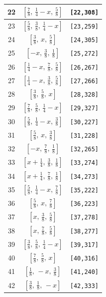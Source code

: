 \documentclass[fleqn,8pt]{jsarticle}
\begin{document}
\begin{longtable}{ccc}
22 & $\left[ \frac{7}{8},\, \frac{1}{4} - x,\, \frac{5}{8} \right]$ & {\tt [22,308]} \\ \hline
23 & $\left[ \frac{5}{8},\, \frac{3}{8},\, \frac{1}{4} - x \right]$ & {\tt [23,259]} \\ \hline
24 & $\left[ \frac{3}{8},\, x,\, \frac{5}{8} \right]$ & {\tt [24,305]} \\ \hline
25 & $\left[ - x,\, \frac{3}{8},\, \frac{1}{8} \right]$ & {\tt [25,272]} \\ \hline
26 & $\left[ \frac{1}{4} - x,\, \frac{7}{8},\, \frac{5}{8} \right]$ & {\tt [26,267]} \\ \hline
27 & $\left[ \frac{1}{4} - x,\, \frac{3}{8},\, \frac{5}{8} \right]$ & {\tt [27,266]} \\ \hline
28 & $\left[ \frac{3}{8},\, \frac{5}{8},\, x \right]$ & {\tt [28,328]} \\ \hline
29 & $\left[ \frac{7}{8},\, \frac{5}{8},\, \frac{1}{4} - x \right]$ & {\tt [29,327]} \\ \hline
30 & $\left[ \frac{5}{8},\, \frac{1}{4} - x,\, \frac{3}{8} \right]$ & {\tt [30,227]} \\ \hline
31 & $\left[ \frac{5}{8},\, x,\, \frac{3}{8} \right]$ & {\tt [31,228]} \\ \hline
32 & $\left[ - x,\, \frac{7}{8},\, \frac{1}{8} \right]$ & {\tt [32,265]} \\ \hline
33 & $\left[ x + \frac{1}{4},\, \frac{3}{8},\, \frac{1}{8} \right]$ & {\tt [33,274]} \\ \hline
34 & $\left[ x + \frac{1}{4},\, \frac{7}{8},\, \frac{1}{8} \right]$ & {\tt [34,273]} \\ \hline
35 & $\left[ \frac{5}{8},\, \frac{1}{4} - x,\, \frac{7}{8} \right]$ & {\tt [35,222]} \\ \hline
36 & $\left[ \frac{5}{8},\, x,\, \frac{7}{8} \right]$ & {\tt [36,223]} \\ \hline
37 & $\left[ x,\, \frac{3}{8},\, \frac{5}{8} \right]$ & {\tt [37,278]} \\ \hline
38 & $\left[ x,\, \frac{7}{8},\, \frac{5}{8} \right]$ & {\tt [38,277]} \\ \hline
39 & $\left[ \frac{3}{8},\, \frac{5}{8},\, \frac{1}{4} - x \right]$ & {\tt [39,317]} \\ \hline
40 & $\left[ \frac{7}{8},\, \frac{5}{8},\, x \right]$ & {\tt [40,316]} \\ \hline
41 & $\left[ \frac{1}{8},\, - x,\, \frac{3}{8} \right]$ & {\tt [41,240]} \\ \hline
42 & $\left[ \frac{3}{8},\, \frac{1}{8},\, - x \right]$ & {\tt [42,333]} \\ \hline

\end{longtable}
\end{document}
